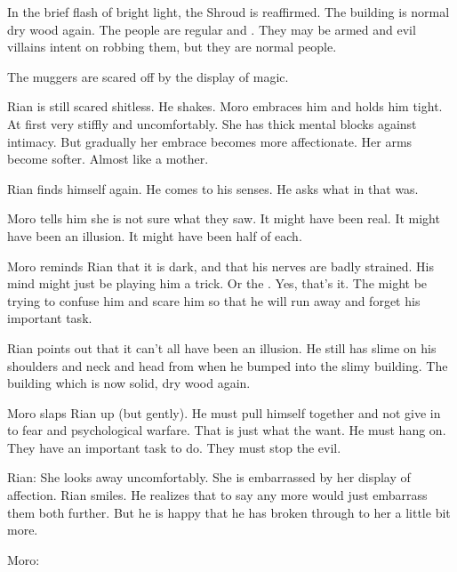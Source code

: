 In the brief flash of bright light, the Shroud is reaffirmed. 
The building is normal dry wood again. 
The people are regular \humans and \scathae.
They may be armed and evil villains intent on robbing them, but they are normal people. 

The muggers are scared off by the display of magic.

\begin{comment}
  \section{Moro comforts Rian}
\end{comment}
Rian is still scared shitless. 
He shakes.
Moro embraces him and holds him tight. 
At first very stiffly and uncomfortably.
She has thick mental blocks against intimacy.
But gradually her embrace becomes more affectionate. 
Her arms become softer.
Almost like a mother. 

Rian finds himself again. 
He comes to his senses. 
He asks what in \itzach that was. 

Moro tells him she is not sure what they saw.
It might have been real.
It might have been an illusion.
It might have been half of each. 

Moro reminds Rian that it is dark, and that his nerves are badly strained. 
His mind might just be playing him a trick. 
Or the \qliphoth.
Yes, that's it.
The \qliphoth might be trying to confuse him and scare him so that he will run away and forget his important task.

Rian points out that it can't all have been an illusion.
He still has slime on his shoulders and neck and head from when he bumped into the slimy building.
The building which is now solid, dry wood again. 

Moro slaps Rian up (but gently).
He must pull himself together and not give in to fear and psychological warfare.
That is just what the \qliphoth want. 
He must hang on.
They have an important task to do.
They must stop the evil. 

Rian:
She looks away uncomfortably.
She is embarrassed by her display of affection. 
Rian smiles. 
He realizes that to say any more would just embarrass them both further. 
But he is happy that he has broken through to her a little bit more. 

Moro:





